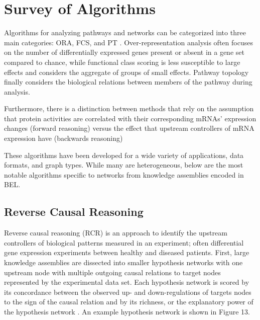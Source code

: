\section{Survey of Algorithms}

Algorithms for analyzing pathways and networks can be categorized into three main categories: \ac{ORA}, \ac{FCS}, and \ac{PT} \cite{Khatri2012}. Over-representation analysis often focuses on the number of differentially expressed genes present or absent in a gene set compared to chance, while functional class scoring is less susceptible to large effects and considers the aggregate of groups of small effects. Pathway topology finally considers the biological relations between members of the pathway during analysis.

Furthermore, there is a distinction between methods that rely on the assumption that protein activities are correlated with their corresponding \ac{mRNA}s' expression changes (forward reasoning) versus the effect that upstream controllers of \ac{mRNA} expression have (backwards reasoning) \cite{Martin2014}

These algorithms have been developed for a wide variety of applications, data formats, and graph types. While many are heterogeneous, below are the most notable algorithms specific to networks from knowledge assemblies encoded in \ac{BEL}.

\subsection{Reverse Causal Reasoning}

Reverse causal reasoning (\ac{RCR}) is an approach to identify the upstream controllers of biological patterns measured in an experiment; often differential gene expression experiments between healthy and diseased patients. First, large knowledge assemblies are dissected into smaller hypothesis networks with one upstream node with multiple outgoing causal relations to target nodes represented by the experimental data set. Each hypothesis network is scored by its concordance between the observed up- and down-regulations of targets nodes to the sign of the causal relation and by its richness, or the explanatory power of the hypothesis network \cite{Catlett2013}. An example hypothesis network is shown in Figure 13.

